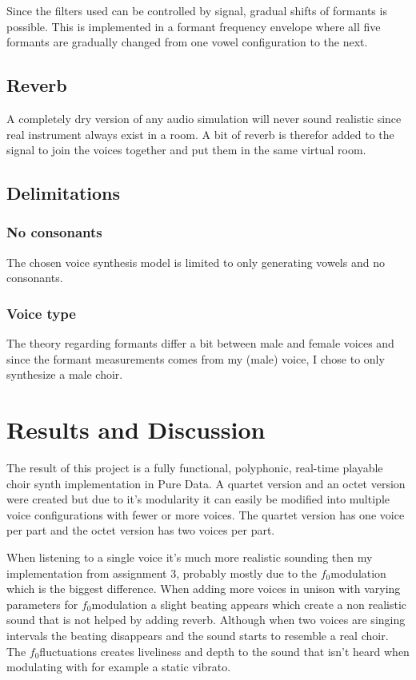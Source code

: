 \documentclass{article}
\newcommand{\fo}{$f_0$}
\begin{document}
Since the filters used can be controlled by signal, gradual shifts of formants is possible. This is implemented in a formant frequency envelope where all five formants are gradually changed from one vowel configuration to the next.

\subsection{Reverb}
A completely dry version of any audio simulation will never sound realistic since real instrument always exist in a room. A bit of reverb is therefor added to the signal to join the voices together and put them in the same virtual room.

\subsection{Delimitations}

\subsubsection{No consonants}
The chosen voice synthesis model is limited to only generating vowels and no consonants.

\subsubsection{Voice type}
The theory regarding formants differ a bit between male and female voices and since the formant measurements comes from my (male) voice, I chose to only synthesize a male choir.

\section{Results and Discussion}\label{sec:results-discussion}
The result of this project is a fully functional, polyphonic, real-time playable choir synth implementation in Pure Data. A quartet version and an octet version were created but due to it's modularity it can easily be modified into multiple voice configurations with fewer or more voices. The quartet version has one voice per part and the octet version has two voices per part.

When listening to a single voice it's much more realistic sounding then my implementation from assignment 3, probably mostly due to the \fo  modulation which is the biggest difference. When adding more voices in unison with varying parameters for \fo  modulation a slight beating appears which create a non realistic sound that is not helped by adding reverb. Although when two voices are singing intervals the beating disappears and the sound starts to resemble a real choir. The \fo  fluctuations creates liveliness and depth to the sound that isn't heard when modulating with for example a static vibrato.
\end{document}
